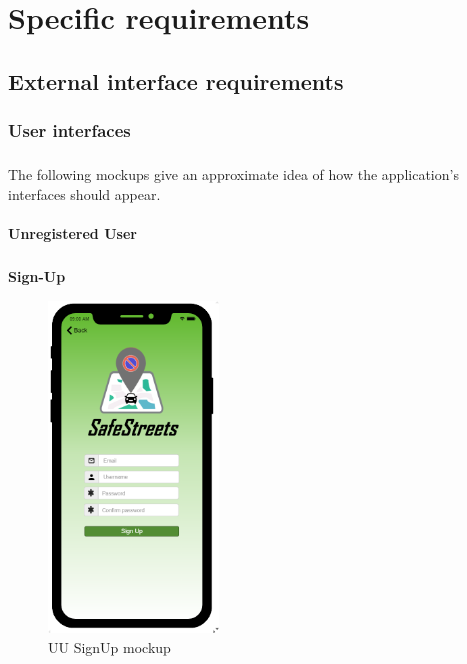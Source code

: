\chapter{Specific requirements}
		\section{External interface requirements}
			\subsection{User interfaces}
				\paragraph{}
					The following mockups give an approximate idea of how the application's interfaces should appear.
				\subsubsection{Unregistered User}
					\paragraph{}
						\begin{center}
						{\small \textbf{Sign-Up}}
						\end{center}
						\vspace{-5mm}
						\begin{figure}[ht]
								\centering
							\includegraphics[height=8.8cm] {images/MockUp/User/SignUp.pdf}
								\caption{UU SignUp mockup}
						\end{figure}
				\clearpage
